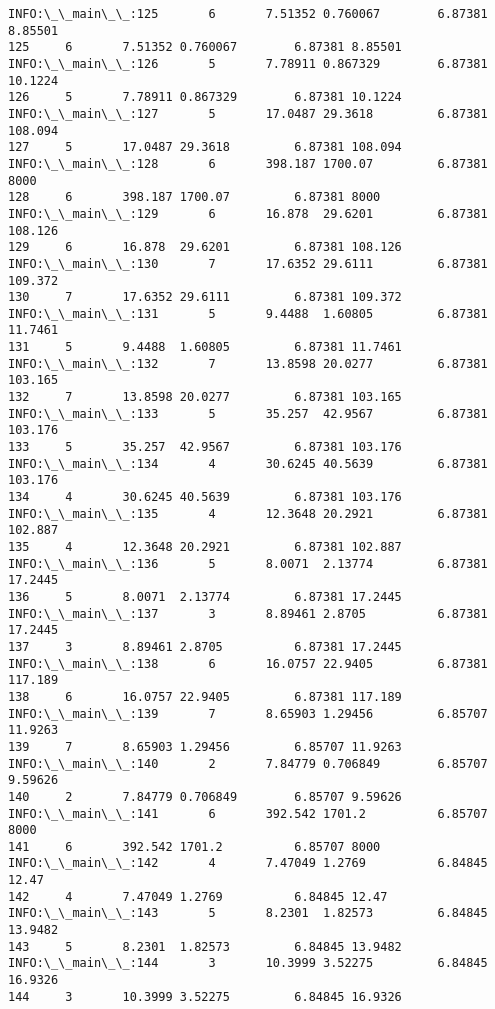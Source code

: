 \documentclass[11pt]{article}
\begin{document}
\begin{Verbatim}[commandchars=\\\{\}]
INFO:\_\_main\_\_:125       6       7.51352 0.760067        6.87381 8.85501
125     6       7.51352 0.760067        6.87381 8.85501
INFO:\_\_main\_\_:126       5       7.78911 0.867329        6.87381 10.1224
126     5       7.78911 0.867329        6.87381 10.1224
INFO:\_\_main\_\_:127       5       17.0487 29.3618         6.87381 108.094
127     5       17.0487 29.3618         6.87381 108.094
INFO:\_\_main\_\_:128       6       398.187 1700.07         6.87381 8000
128     6       398.187 1700.07         6.87381 8000
INFO:\_\_main\_\_:129       6       16.878  29.6201         6.87381 108.126
129     6       16.878  29.6201         6.87381 108.126
INFO:\_\_main\_\_:130       7       17.6352 29.6111         6.87381 109.372
130     7       17.6352 29.6111         6.87381 109.372
INFO:\_\_main\_\_:131       5       9.4488  1.60805         6.87381 11.7461
131     5       9.4488  1.60805         6.87381 11.7461
INFO:\_\_main\_\_:132       7       13.8598 20.0277         6.87381 103.165
132     7       13.8598 20.0277         6.87381 103.165
INFO:\_\_main\_\_:133       5       35.257  42.9567         6.87381 103.176
133     5       35.257  42.9567         6.87381 103.176
INFO:\_\_main\_\_:134       4       30.6245 40.5639         6.87381 103.176
134     4       30.6245 40.5639         6.87381 103.176
INFO:\_\_main\_\_:135       4       12.3648 20.2921         6.87381 102.887
135     4       12.3648 20.2921         6.87381 102.887
INFO:\_\_main\_\_:136       5       8.0071  2.13774         6.87381 17.2445
136     5       8.0071  2.13774         6.87381 17.2445
INFO:\_\_main\_\_:137       3       8.89461 2.8705          6.87381 17.2445
137     3       8.89461 2.8705          6.87381 17.2445
INFO:\_\_main\_\_:138       6       16.0757 22.9405         6.87381 117.189
138     6       16.0757 22.9405         6.87381 117.189
INFO:\_\_main\_\_:139       7       8.65903 1.29456         6.85707 11.9263
139     7       8.65903 1.29456         6.85707 11.9263
INFO:\_\_main\_\_:140       2       7.84779 0.706849        6.85707 9.59626
140     2       7.84779 0.706849        6.85707 9.59626
INFO:\_\_main\_\_:141       6       392.542 1701.2          6.85707 8000
141     6       392.542 1701.2          6.85707 8000
INFO:\_\_main\_\_:142       4       7.47049 1.2769          6.84845 12.47
142     4       7.47049 1.2769          6.84845 12.47
INFO:\_\_main\_\_:143       5       8.2301  1.82573         6.84845 13.9482
143     5       8.2301  1.82573         6.84845 13.9482
INFO:\_\_main\_\_:144       3       10.3999 3.52275         6.84845 16.9326
144     3       10.3999 3.52275         6.84845 16.9326

\end{Verbatim}
\end{document}
